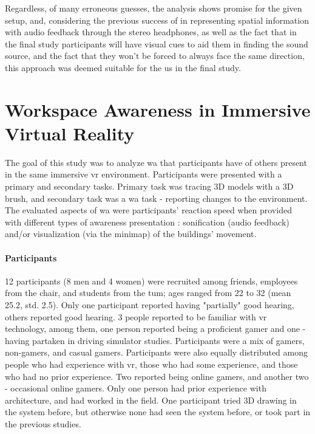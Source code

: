 Regardless, of many erroneous guesses, the analysis shows promise for the given setup, and, considering the previous success of \parencite{gutwin_chalk_2011} in representing spatial information with audio feedback through the stereo headphones, as well as the fact that in the final study participants will have visual cues to aid them in finding the sound source, and the fact that they won't be forced to always face the same direction, this approach was deemed suitable for the us in the final study.
















\section{Workspace Awareness in Immersive Virtual Reality}
\label{final_study}

The goal of this study was to analyze \gls{wa} that participants have of others present in the same immersive \gls{vr} environment. Participants were presented with a primary and secondary tasks. Primary task was tracing 3D models with a 3D brush, and secondary task was a \gls{wa} task - reporting changes to the environment.
The evaluated aspects of \gls{wa} were participants’ reaction speed when provided with different types of awareness presentation : sonification (audio feedback) and/or visualization (via the minimap) of the buildings' movement.

\paragraph{Participants}
12 participants (8 men and 4 women) were recruited among friends, employees from the chair, and students from the \gls{tum}; ages ranged from 22 to 32 (mean 25.2, std. 2.5). Only one participant reported having "partially" good hearing, others reported good hearing. 3 people reported to be familiar with \gls{vr} technology, among them, one person reported being a proficient gamer and one - having partaken in driving simulator studies. Participants were a mix of gamers, non-gamers, and casual gamers. Participants were also equally distributed among people who had experience with \gls{vr}, those who had some experience, and those who had no prior experience. Two reported being online gamers, and another two - occasional online gamers. Only one person had prior experience with architecture, and had worked in the field. One participant tried 3D drawing in the system before, but otherwise none had seen the system before, or took part in the previous studies.

